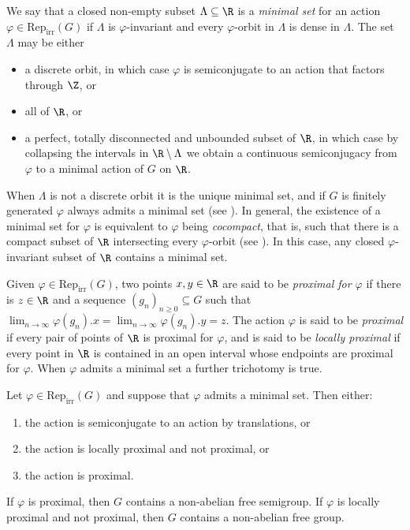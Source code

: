 \documentclass[reqno]{amsart}
\begin{document}
We say that a closed non-empty subset $\Lambda \subseteq \R$ is a \emph{minimal set} for an action $\varphi \in \mathrm{Rep}_\mathrm{irr}(G)$ if $\Lambda$ is $\varphi$-invariant and every $\varphi$-orbit in $\Lambda$ is dense in $\Lambda$. The set $\Lambda$ may be either
\begin{itemize}
        \item a discrete orbit, in which case $\varphi$ is semiconjugate to an action that factors through $\Z$, or
        \item all of $\R$, or
        \item a perfect, totally disconnected and unbounded subset of $\R$, in which case by collapsing the intervals in $\R \setminus \Lambda$ we obtain a continuous semiconjugacy from $\varphi$ to a minimal action of $G$ on $\R$.
\end{itemize}
When $\Lambda$ is not a discrete orbit it is the unique minimal set, and if $G$ is finitely generated $\varphi$ always admits a minimal set (see \cite[Lemma 3.5.18]{DeroinNavasRivas2016}). In general, the existence of a minimal set for $\varphi$ is equivalent to $\varphi$ being \emph{cocompact}, that is, such that there is a compact subset of $\R$ intersecting every $\varphi$-orbit (see \cite[Proposition 2.1.2]{Navas2011}). In this case, any closed $\varphi$-invariant subset of $\R$ contains a minimal set.

Given $\varphi \in \mathrm{Rep}_\mathrm{irr}(G)$, two points $x,y \in \R$ are said to be \emph{proximal for $\varphi$} if there is $z \in \R$ and a sequence $(g_n)_{n \geq 0} \subseteq G$ such that $\lim_{n \to \infty} \varphi(g_n).x = \lim_{n \to \infty} \varphi(g_n).y = z$. The action $\varphi$ is said to be \emph{proximal} if every pair of points of $\R$ is proximal for $\varphi$, and is said to be \emph{locally proximal} if every point in $\R$ is contained in an open interval whose endpoints are proximal for $\varphi$.  When $\varphi$ admits a minimal set a further trichotomy is true.
\begin{teo} \label{teo:tits}
Let $\varphi \in \mathrm{Rep}_\mathrm{irr}(G)$ and suppose that $\varphi$ admits a minimal set. Then either:
\begin{enumerate}[label=(\Roman*)]
        \item the action is semiconjugate to an action by translations, or
           \item the action is locally proximal and not proximal, or
        \item the action is proximal.
     
\end{enumerate}
If $\varphi$ is proximal, then $G$ contains a non-abelian free semigroup. If $\varphi$ is locally proximal and not proximal, then $G$ contains a non-abelian free group.
\end{teo}
\end{document}
